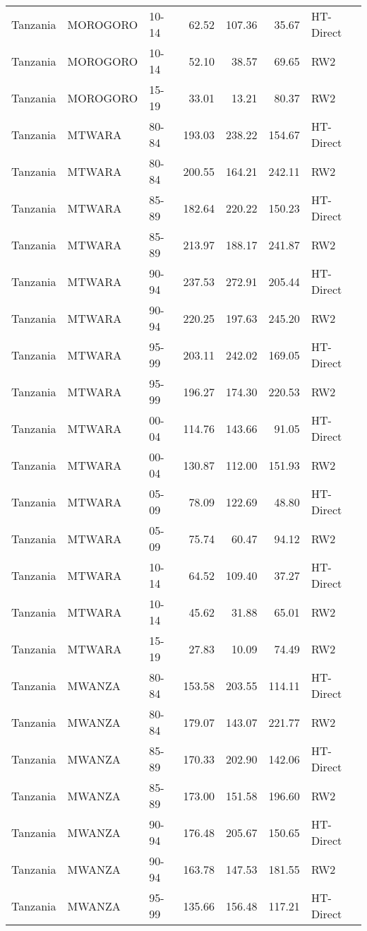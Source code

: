 \begin{longtable}{lllrrrl}
  Tanzania & MOROGORO & 10-14 & 62.52 & 107.36 & 35.67 & HT-Direct \\ 
  Tanzania & MOROGORO & 10-14 & 52.10 & 38.57 & 69.65 & RW2 \\ 
  Tanzania & MOROGORO & 15-19 & 33.01 & 13.21 & 80.37 & RW2 \\ 
  Tanzania & MTWARA & 80-84 & 193.03 & 238.22 & 154.67 & HT-Direct \\ 
  Tanzania & MTWARA & 80-84 & 200.55 & 164.21 & 242.11 & RW2 \\ 
  Tanzania & MTWARA & 85-89 & 182.64 & 220.22 & 150.23 & HT-Direct \\ 
  Tanzania & MTWARA & 85-89 & 213.97 & 188.17 & 241.87 & RW2 \\ 
  Tanzania & MTWARA & 90-94 & 237.53 & 272.91 & 205.44 & HT-Direct \\ 
  Tanzania & MTWARA & 90-94 & 220.25 & 197.63 & 245.20 & RW2 \\ 
  Tanzania & MTWARA & 95-99 & 203.11 & 242.02 & 169.05 & HT-Direct \\ 
  Tanzania & MTWARA & 95-99 & 196.27 & 174.30 & 220.53 & RW2 \\ 
  Tanzania & MTWARA & 00-04 & 114.76 & 143.66 & 91.05 & HT-Direct \\ 
  Tanzania & MTWARA & 00-04 & 130.87 & 112.00 & 151.93 & RW2 \\ 
  Tanzania & MTWARA & 05-09 & 78.09 & 122.69 & 48.80 & HT-Direct \\ 
  Tanzania & MTWARA & 05-09 & 75.74 & 60.47 & 94.12 & RW2 \\ 
  Tanzania & MTWARA & 10-14 & 64.52 & 109.40 & 37.27 & HT-Direct \\ 
  Tanzania & MTWARA & 10-14 & 45.62 & 31.88 & 65.01 & RW2 \\ 
  Tanzania & MTWARA & 15-19 & 27.83 & 10.09 & 74.49 & RW2 \\ 
  Tanzania & MWANZA & 80-84 & 153.58 & 203.55 & 114.11 & HT-Direct \\ 
  Tanzania & MWANZA & 80-84 & 179.07 & 143.07 & 221.77 & RW2 \\ 
  Tanzania & MWANZA & 85-89 & 170.33 & 202.90 & 142.06 & HT-Direct \\ 
  Tanzania & MWANZA & 85-89 & 173.00 & 151.58 & 196.60 & RW2 \\ 
  Tanzania & MWANZA & 90-94 & 176.48 & 205.67 & 150.65 & HT-Direct \\ 
  Tanzania & MWANZA & 90-94 & 163.78 & 147.53 & 181.55 & RW2 \\ 
  Tanzania & MWANZA & 95-99 & 135.66 & 156.48 & 117.21 & HT-Direct \\ 

\end{longtable}
